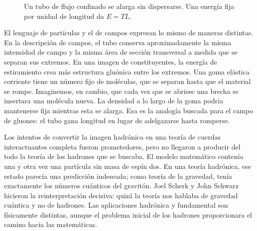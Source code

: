 \begin{figure}[H]
  \centering
  \caption{Un tubo de flujo confinado se alarga sin dispersarse. Una energía fija por
  unidad de longitud da \(E=TL\).}
  \label{fig:l01-qcd-flux-redraw}
\end{figure}

El lenguaje de partículas y el de campos expresan lo mismo de maneras distintas. En
la descripción de campos, el tubo conserva aproximadamente la misma intensidad de campo y
la misma área de sección transversal a medida que se separan sus extremos. En una imagen de constituyentes, la energía de estiramiento crea más estructura gluónica entre los extremos.
Una goma elástica corriente tiene un número fijo de moléculas, que se separan hasta que el material se rompe. Imaginemos, en cambio, que cada vez que se abriese una brecha se insertara una molécula nueva. La densidad a lo largo de la goma podría mantenerse fija
mientras esta se alarga. Esa es la analogía buscada para el campo de gluones: el tubo gana longitud en lugar de adelgazarse hasta romperse.

\begin{classroomqa}
\end{classroomqa}

Los intentos de convertir la imagen hadrónica en una teoría de cuerdas interactuantes completa
fueron prometedores, pero no llegaron a producir del todo la teoría de los
hadrones que se buscaba. El modelo matemático contenía una y otra vez una partícula sin masa de
espín dos. En una teoría hadrónica, ese estado parecía una predicción indeseada; como teoría de la gravedad, tenía exactamente los números cuánticos del gravitón.
Joel Scherk y John Schwarz hicieron la reinterpretación decisiva: quizá la teoría nos hablaba de gravedad cuántica y no de hadrones. Las aplicaciones hadrónica y fundamental son físicamente distintas, aunque el problema inicial de los hadrones proporcionara el camino hacia las matemáticas.

